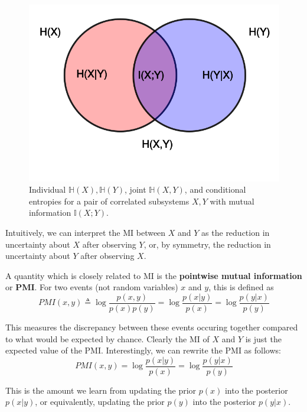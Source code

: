 \documentclass[graybox, envcountchap, twocolumn]{styles/svmult}
\begin{document}
\begin{figure}[hbtp]
\centering
    \includegraphics[scale=.25]{mutual-information.png}
\caption{Individual $\mathbb{H}(X),\mathbb{H}(Y)$, joint $\mathbb{H}(X,Y)$, and conditional entropies for a pair of correlated subsystems $X,Y$ with mutual information $\mathbb{I}(X;Y)$.}
\label{fig:mi} 
\end{figure}

Intuitively, we can interpret the MI between $X$ and $Y$ as the reduction in uncertainty about $X$ after observing $Y$, or, by symmetry, the reduction in uncertainty about $Y$ after observing $X$.

A quantity which is closely related to MI is the \textbf{pointwise mutual information} or \textbf{PMI}. For two events (not random variables) $x$ and $y$, this is defined as
\begin{equation}
PMI(x,y) \triangleq \log\dfrac{p(x,y)}{p(x)p(y)}=\log\dfrac{p(x|y)}{p(x)}=\log\dfrac{p(y|x)}{p(y)}
\end{equation}

This measures the discrepancy between these events occuring together compared to what would be expected by chance. Clearly the MI of $X$ and $Y$ is just the expected value of the PMI. Interestingly, we can rewrite the PMI as follows:
\begin{equation}
PMI(x,y)=\log\dfrac{p(x|y)}{p(x)}=\log\dfrac{p(y|x)}{p(y)}
\end{equation}

This is the amount we learn from updating the prior $p(x)$ into the posterior $p(x|y)$, or equivalently, updating the prior $p(y)$ into the posterior $p(y |x)$.
\end{document}
